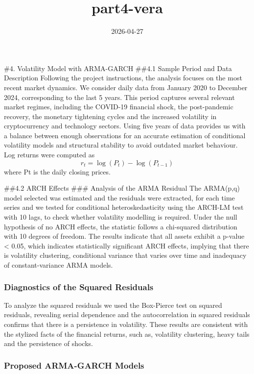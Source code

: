 \documentclass[
]{article}
\title{part4-vera}
\author{}
\date{\vspace{-2.5em}2026-04-27}
\begin{document}
\maketitle

\#4. Volatility Model with ARMA-GARCH \#\#4.1 Sample Period and Data
Description Following the project instructions, the analysis focuses on
the most recent market dynamics. We consider daily data from January
2020 to December 2024, corresponding to the last 5 years. This period
captures several relevant market regimes, including the COVID-19
financial shock, the post-pandemic recovery, the monetary tightening
cycles and the increased volatility in cryptocurrency and technology
sectors. Using five years of data provides us with a balance between
enough observations for an accurate estimation of conditional volatility
models and structural stability to avoid outdated market behaviour. Log
returns were computed as \[
r_t = \log(P_t) - \log(P_{t-1})
\] where Pt is the daily closing prices.

\#\#4.2 ARCH Effects \#\#\# Analysis of the ARMA Residual The ARMA(p,q)
model selected was estimated and the residuals were extracted, for each
time series and we tested for conditional heteroskedasticity using the
ARCH-LM test with 10 lags, to check whether volatility modelling is
required. Under the null hypothesis of no ARCH effects, the statistic
follows a chi-squared distribution with 10 degrees of freedom. The
results indicate that all assets exhibit a p-value \textless{} 0.05,
which indicates statistically significant ARCH effects, implying that
there is volatility clustering, conditional variance that varies over
time and inadequacy of constant-variance ARMA models.

\subsubsection{Diagnostics of the Squared
Residuals}\label{diagnostics-of-the-squared-residuals}

To analyze the squared residuals we used the Box-Pierce test on squared
residuals, revealing serial dependence and the autocorrelation in
squared residuals confirms that there is a persistence in volatility.
These results are consistent with the stylized facts of the financial
returns, such as, volatility clustering, heavy tails and the persistence
of shocks.

\subsubsection{Proposed ARMA-GARCH
Models}\label{proposed-arma-garch-models}
\end{document}
